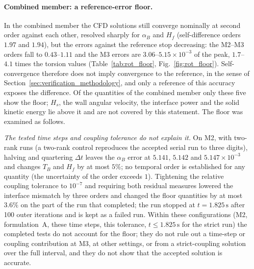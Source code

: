 \paragraph{Combined member: a reference-error floor.}
In the combined member the CFD solutions still converge nominally at second order against each other, resolved sharply for $\alpha_B$ and $H_f$ (self-difference orders $1.97$ and $1.94$), but the errors against the reference stop decreasing: the M2--M3 orders fall to $0.43$--$1.11$ and the M3 errors are $3.06$--$5.15\times10^{-3}$ of the peak, $1.7$--$4.1$ times the torsion values (Table~\ref{tab:rot_floor}, Fig.~\ref{fig:rot_floor}).
Self-convergence therefore does not imply convergence to the reference, in the sense of Section~\ref{sec:verification_methodology}, and only a reference of this accuracy exposes the difference.
Of the quantities of the combined member only these five show the floor; $H_s$, the wall angular velocity, the interface power and the solid kinetic energy lie above it and are not covered by this statement.
The floor was examined as follows.

\emph{The tested time steps and coupling tolerance do not explain it.}
On M2, with two-rank runs (a two-rank control reproduces the accepted serial run to three digits), halving and quartering $\Delta t$ leaves the $\alpha_B$ error at $5.141$, $5.142$ and $5.147\times10^{-3}$ and changes $T_B$ and $H_f$ by at most $5\%$; no temporal order is established for any quantity (the uncertainty of the order exceeds $1$).
Tightening the relative coupling tolerance to $10^{-7}$ and requiring both residual measures lowered the interface mismatch by three orders and changed the floor quantities by at most $3.6\%$ on the part of the run that completed; the run stopped at $t=1.825\,\mathrm{s}$ after 100 outer iterations and is kept as a failed run.
Within these configurations (M2, formulation~A, these time steps, this tolerance, $t\le1.825\,\mathrm{s}$ for the strict run) the completed tests do not account for the floor; they do not rule out a time-step or coupling contribution at M3, at other settings, or from a strict-coupling solution over the full interval, and they do not show that the accepted solution is accurate.

